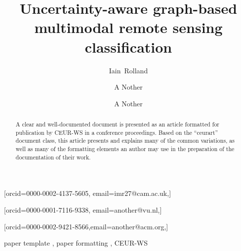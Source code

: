 \documentclass[
twocolumn,
]{ceurart}
\begin{document}


\title{Uncertainty-aware graph-based multimodal remote sensing classification}

\author[1]{Iain~Rolland}[orcid=0000-0002-4137-5605, email=imr27@cam.ac.uk,]

\address[1]{Department of Engineering, University of Cambridge, Cambridge, CB2 1PZ United Kingdom}
\address[2]{Joint Institute for Nuclear Research, 6 Joliot-Curie, Dubna, Moscow region, 141980, Russian Federation}

\author[2]{A Nother}[orcid=0000-0001-7116-9338, email=another@vu.nl,]
\address[3]{Vrije Universiteit Amsterdam, De Boelelaan 1105, 1081 HV Amsterdam, The Netherlands}

\author[3]{A Nother}[orcid=0000-0002-9421-8566,email=another@acm.org,]

\begin{abstract}
  A clear and well-documented document is presented as an article formatted for publication by CEUR-WS in a conference proceedings.
  Based on the ``ceurart'' document class, this article presents and explains many of the common variations, as well as many of the formatting elements an author may use in the preparation of the documentation of their work.
\end{abstract}

\begin{keywords}
  paper template \sep
  paper formatting \sep
  CEUR-WS
\end{keywords}

\maketitle
\end{document}
